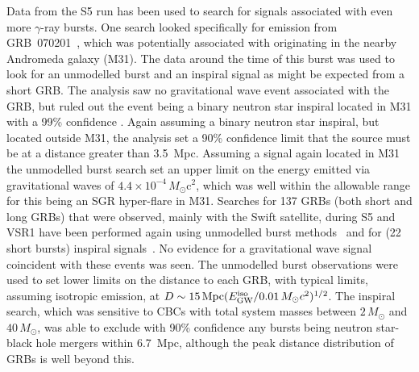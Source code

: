 \documentclass{article}
\begin{document}
Data from the S5 run has been used to search for signals associated with even
more $\gamma$-ray bursts. One search looked specifically for emission from
GRB~070201~\cite{Golenetskii:2007a, Golenetskii:2007b}, which was potentially
associated with originating in the nearby Andromeda galaxy (M31). The data
around the time of this burst was used to look for an unmodelled burst and an
inspiral signal as might be expected from a short GRB. The analysis saw no
gravitational wave event associated with the GRB, but ruled out the event being
a binary neutron star inspiral located in M31 with a 99\% confidence
\cite{Abbott:2008g}. Again assuming a binary neutron star inspiral, but located
outside M31, the analysis set a 90\% confidence limit that the source must be at
a distance greater than 3.5~Mpc. Assuming a signal again located in M31 the
unmodelled burst search set an upper limit on the energy emitted via
gravitational waves of $4.4\times10^{-4}\,M_{\odot}$c$^2$, which was
well within the allowable range for this being an SGR hyper-flare in M31.
Searches for 137 GRBs (both short and long GRBs) that were observed, mainly with
the Swift satellite, during S5 and VSR1 have been performed again using
unmodelled burst methods~\cite{Abbott:2009d} and for (22 short bursts) inspiral
signals~\cite{Abadie:2010b}. No evidence for a gravitational wave signal
coincident with these events was seen. The unmodelled burst observations were
used to set lower limits on the distance to each GRB, with typical limits,
assuming isotropic emission, at $D\sim15\,{\rm Mpc}(E^{\rm iso}_{\rm
GW}/0.01\,M_{\odot}c^2)^{1/2}$. The inspiral search, which was sensitive to CBCs
with total system masses between $2\,M_{\odot}$ and $40\,M_{\odot}$, was able to
exclude with 90\% confidence any bursts being neutron star-black hole mergers
within 6.7~Mpc, although the peak distance distribution of GRBs is well beyond
this.
\end{document}
